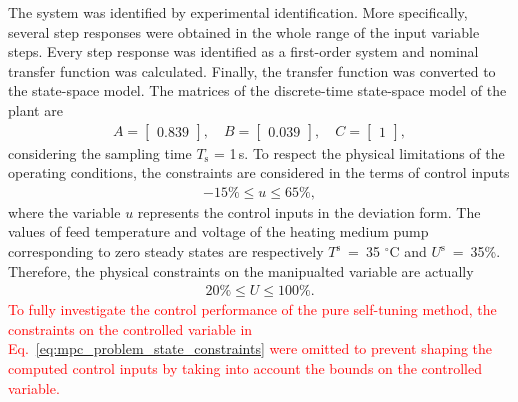 \documentclass[preprint,12pt]{elsarticle}
\begin{document}
	The system was identified by experimental identification. More specifically, several step responses were obtained in the whole range of the input variable steps. Every step response was identified as a first-order system and nominal transfer function was calculated. Finally, the transfer function was converted to the state-space model. The matrices of the discrete-time state-space model of the plant are
	\begin{subequations}
		\label{eq:model_A_B} 
		\begin{eqnarray}
			A = \begin{bmatrix}
				0.839
			\end{bmatrix}, \quad
			B = \begin{bmatrix}
				0.039
			\end{bmatrix}, \quad
			C = \begin{bmatrix}
				1
			\end{bmatrix}, 
		\end{eqnarray}
	\end{subequations}
	considering the sampling time $T_\mathrm{s}$ = 1\,s. 
	To respect the physical limitations of the operating conditions, the constraints are considered in the terms of control inputs
	\begin{eqnarray}
		\label{eq:u_const}
		-15\% \le u \le 65\%,
	\end{eqnarray}
	where the variable $u$ represents the control inputs in the deviation form. The values of feed temperature and voltage of the heating medium pump corresponding to zero steady states are respectively $T^\mathrm{s}$~=~35 $^{\circ}\mathrm{C}$ and $U^\mathrm{s}$~=~35\%. Therefore, the physical constraints on the manipualted variable are actually
	\begin{eqnarray}
		\label{eq:U_const}
		20\% \le U \le 100\%.
	\end{eqnarray}	
	\textcolor{red}{To fully investigate the control performance of the pure self-tuning method, the constraints on the controlled variable in Eq.~\eqref{eq:mpc_problem_state_constraints} were omitted to prevent shaping the computed control inputs by taking into account the bounds on the controlled variable.} 
	
\end{document}
